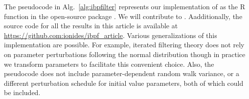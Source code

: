 \documentclass[12pt]{article}\usepackage[]{graphicx}\usepackage[]{xcolor}
\begin{document}
The pseudocode in Alg.~\ref{alg:ibpfilter} represents our implementation of {\ibpf} as the R function  in the open-source package  \citep{asfaw21github,asfaw21arxiv}.
We will contribute  to .
Aadditionally, the source code for all the results in this article is available at \url{https://github.com:ionides/ibpf_article}.
Various generalizations of this implementation are possible.
For example, iterated filtering theory does not rely on parameter perturbations following the normal distribution \citep{ionides15} though in practice we transform parameters to facilitate this convenient choice.
Also, the pseudocode does not include parameter-dependent random walk variance, or a different perturbation schedule for initial value parameters, both of which could be included.

\end{document}
